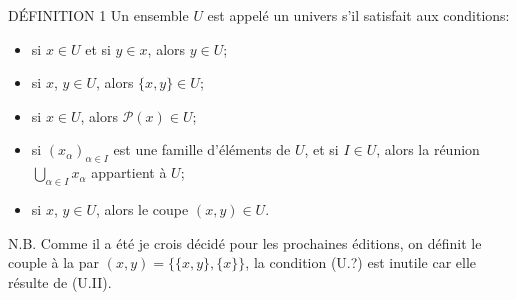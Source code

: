 \begin{enonce*}{DÉFINITION 1}
Un ensemble $U$ est appelé un univers s'il satisfait aux conditions:
\begin{itemize}
\item[(U.I)] si $x\in U$ et si $y\in x$, alors $y\in U$;

\item[(U.II)] si $x$, $y\in U$, alors $\{x,y\}\in U$;

\item[(U.III)] si $x\in U$, alors $\mathcal{P}(x)\in U$;

\item[(U.IV)] si $(x_{\alpha})_{\alpha\in I}$ est une famille
d'éléments de $U$, et si $I\in U$, alors la réunion
$\bigcup_{\alpha\in I}x_{\alpha}$ appartient à $U$;

\item[(U.?)] si $x$, $y\in U$, alors le coupe $(x,y)\in U$.
\end{itemize}
\end{enonce*}
\noindent N.B. Comme il a été je crois décidé pour les prochaines
éditions, on définit le couple à la 
par $(x,y)=\{\{x,y\}, \{x\}\}$, la condition (U.?) est inutile car
elle résulte de (U.II).

